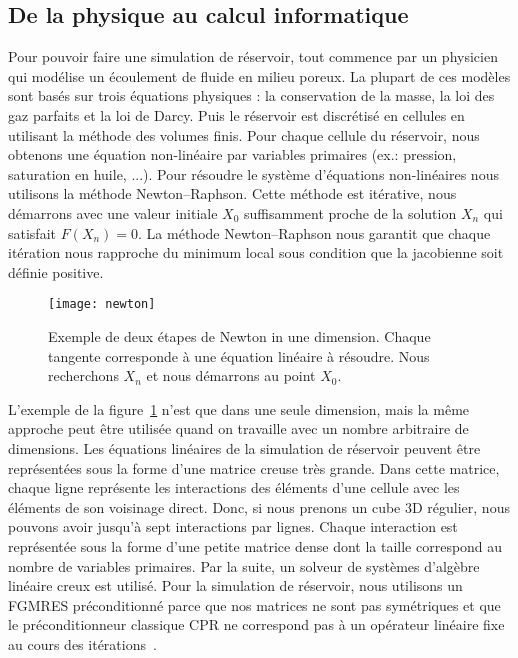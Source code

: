 \subsection{De la physique au calcul informatique}
Pour pouvoir faire une simulation de réservoir, tout commence par un physicien qui modélise un écoulement de fluide en milieu poreux.
%
La plupart de ces modèles sont basés sur trois équations physiques : la conservation de la masse, la loi des gaz parfaits et la loi de Darcy.
%
Puis le réservoir est discrétisé en cellules en utilisant la méthode des volumes finis.
%
Pour chaque cellule du réservoir, nous obtenons une équation non-linéaire par variables primaires (ex.: pression, saturation en huile, ...).
%
Pour résoudre le système d'équations non-linéaires nous utilisons la méthode Newton–Raphson.
%
Cette méthode est itérative, nous démarrons avec une valeur initiale $X_0$ suffisamment proche de la solution $X_n$ qui satisfait $F(X_n) = 0$.
%
La méthode Newton–Raphson nous garantit que chaque itération nous rapproche du minimum local sous condition que la jacobienne soit définie positive.

\begin{figure}[!ht]
  \centering
  \texttt{[image: newton]}
  \caption{Exemple de deux étapes de Newton in une dimension.
    Chaque tangente corresponde à une équation linéaire à résoudre.
    Nous recherchons $X_n$ et nous démarrons au point $X_0$.}
\label{fig:newton}
\end{figure}

L'exemple de la figure~\ref{fig:newton} n'est que dans une seule dimension, mais la même approche peut être utilisée quand on travaille avec un nombre arbitraire de dimensions.
%
Les équations linéaires de la simulation de réservoir peuvent être représentées sous la forme d'une matrice creuse très grande.
%
Dans cette matrice, chaque ligne représente les interactions des éléments d'une cellule avec les éléments de son voisinage direct.
%
Donc, si nous prenons un cube 3D régulier, nous pouvons avoir jusqu'à sept interactions par lignes.
%
Chaque interaction est représentée sous la forme d'une petite matrice dense dont la taille correspond au nombre de variables primaires.
%
Par la suite, un solveur de systèmes d'algèbre linéaire creux est utilisé.
%
Pour la simulation de réservoir, nous utilisons un FGMRES préconditionné parce que nos matrices ne sont pas symétriques et que le préconditionneur classique CPR ne correspond pas à un opérateur linéaire fixe au cours des itérations~\cite{cao2005parallel}.
